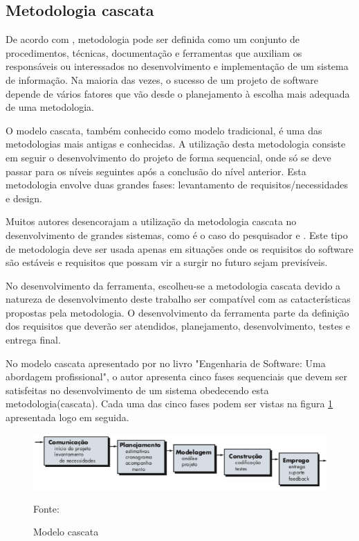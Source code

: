 \subsection{Metodologia cascata}

De acordo com , metodologia pode ser definida como um conjunto de procedimentos, técnicas, documentação e ferramentas que 
auxiliam os responsáveis ou interessados no desenvolvimento e implementação de um sistema de informação. Na maioria das vezes, o sucesso
de um projeto de software depende de vários fatores que vão desde o planejamento à escolha mais adequada de uma metodologia.

O modelo cascata, também conhecido como modelo tradicional, é uma das metodologias mais antigas e conhecidas. A utilização desta 
metodologia consiste em seguir o desenvolvimento do projeto de forma sequencial, onde só se deve passar para os níveis seguintes após
a conclusão do nível anterior. Esta metodologia envolve duas grandes fases: levantamento de requisitos/necessidades e design. \cite{semedo2012ganhos}

Muitos autores desencorajam a utilização da metodologia cascata no desenvolvimento de grandes sistemas, como é o caso do pesquisador
  e . Este tipo de metodologia deve ser usada apenas em situações onde os requisitos do software são estáveis e requisitos
que possam vir a surgir no futuro sejam previsíveis. \cite{semedo2012ganhos}

No desenvolvimento da ferramenta, escolheu-se a metodologia cascata devido a natureza de desenvolvimento deste trabalho ser compatível com as 
catacterísticas propostas pela metodologia. O desenvolvimento da ferramenta parte da definição dos requisitos que deverão
ser atendidos, planejamento, desenvolvimento, testes e entrega final.

No modelo cascata apresentado por  no livro "Engenharia de Software: Uma abordagem profissional", o autor
apresenta cinco fases sequenciais que devem ser satisfeitas no desenvolvimento de um sistema obedecendo esta metodologia(cascata). 
Cada uma das cinco fases podem ser vistas na figura \ref{cascata} apresentada logo em seguida.

\begin{figure}[h]
	\centering
	\includegraphics[keepaspectratio=true,scale=0.6]{figuras/cascata.png}
	\caption{Modelo cascata}
	Fonte: \cite{pressman}
	\label{cascata}
\end{figure}



